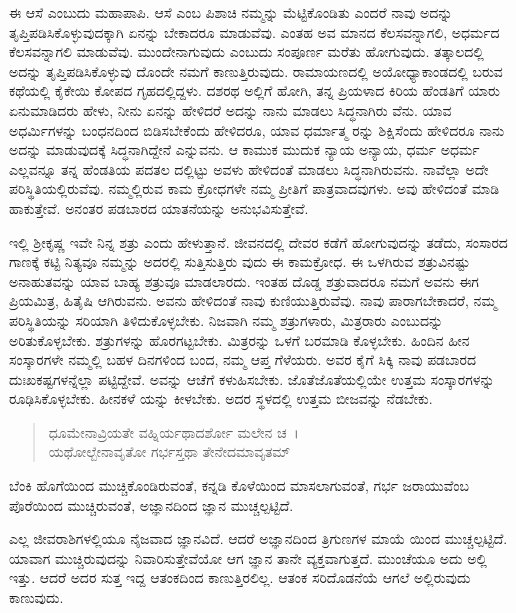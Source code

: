 ಈ ಆಸೆ ಎಂಬುದು ಮಹಾಪಾಪಿ. ಆಸೆ ಎಂಬ ಪಿಶಾಚಿ ನಮ್ಮನ್ನು ಮೆಟ್ಟಿಕೊಂಡಿತು ಎಂದರೆ ನಾವು ಅದನ್ನು ತೃಪ್ತಿಪಡಿಸಿಕೊಳ್ಳುವುದಕ್ಕಾಗಿ ಏನನ್ನು ಬೇಕಾದರೂ ಮಾಡುವೆವು. ಎಂತಹ ಅವ ಮಾನದ ಕೆಲಸವನ್ನಾಗಲಿ, ಅಧರ್ಮದ ಕೆಲಸವನ್ನಾಗಲಿ ಮಾಡುವೆವು. ಮುಂದೇನಾಗುವುದು ಎಂಬುದು ಸಂಪೂರ್ಣ ಮರೆತು ಹೋಗುವುದು. ತತ್ಕಾಲದಲ್ಲಿ ಅದನ್ನು ತೃಪ್ತಿಪಡಿಸಿಕೊಳ್ಳುವು ದೊಂದೇ ನಮಗೆ ಕಾಣುತ್ತಿರುವುದು. ರಾಮಾಯಣದಲ್ಲಿ ಅಯೋಧ್ಯಾಕಾಂಡದಲ್ಲಿ ಬರುವ ಕಥೆಯಲ್ಲಿ ಕೈಕೇಯಿ ಕೋಪದ ಗೃಹದಲ್ಲಿದ್ದಳು. ದಶರಥ ಅಲ್ಲಿಗೆ ಹೋಗಿ, ತನ್ನ ಪ್ರಿಯಳಾದ ಕಿರಿಯ ಹೆಂಡತಿಗೆ ಯಾರು ಏನುಮಾಡಿದರು ಹೇಳು, ನೀನು ಏನನ್ನು ಹೇಳಿದರೆ ಅದನ್ನು ನಾನು ಮಾಡಲು ಸಿದ್ಧನಾಗಿರು ವೆನು. ಯಾವ ಅಧರ್ಮಿಗಳನ್ನು ಬಂಧನದಿಂದ ಬಿಡಿಸಬೇಕೆಂದು ಹೇಳಿದರೂ, ಯಾವ ಧರ್ಮಾತ್ಮ ರನ್ನು ಶಿಕ್ಷಿಸೆಂದು ಹೇಳಿದರೂ ನಾನು ಅದನ್ನು ಮಾಡುವುದಕ್ಕೆ ಸಿದ್ಧನಾಗಿದ್ದೇನೆ ಎನ್ನುವನು. ಆ ಕಾಮುಕ ಮುದುಕ ನ್ಯಾಯ ಅನ್ಯಾಯ, ಧರ್ಮ ಅಧರ್ಮ ಎಲ್ಲವನ್ನೂ ತನ್ನ ಹೆಂಡತಿಯ ಪದತಲ ದಲ್ಲಿಟ್ಟು ಅವಳು ಹೇಳಿದಂತೆ ಮಾಡಲು ಸಿದ್ಧನಾಗಿರುವನು. ನಾವೆಲ್ಲಾ ಅದೇ ಪರಿಸ್ಥಿತಿಯಲ್ಲಿರುವೆವು. ನಮ್ಮಲ್ಲಿರುವ ಕಾಮ ಕ್ರೋಧಗಳೇ ನಮ್ಮ ಪ್ರೀತಿಗೆ ಪಾತ್ರವಾದವುಗಳು. ಅವು ಹೇಳಿದಂತೆ ಮಾಡಿ ಹಾಕುತ್ತೇವೆ. ಅನಂತರ ಪಡಬಾರದ ಯಾತನೆಯನ್ನು ಅನುಭವಿಸುತ್ತೇವೆ.

ಇಲ್ಲಿ ಶ‍್ರೀಕೃಷ್ಣ ಇವೇ ನಿನ್ನ ಶತ್ರು ಎಂದು ಹೇಳುತ್ತಾನೆ. ಜೀವನದಲ್ಲಿ ದೇವರ ಕಡೆಗೆ ಹೋಗುವುದನ್ನು ತಡೆದು, ಸಂಸಾರದ ಗಾಣಕ್ಕೆ ಕಟ್ಟಿ ನಿತ್ಯವೂ ನಮ್ಮನ್ನು ಅದರಲ್ಲಿ ಸುತ್ತಿಸುತ್ತಿರು ವುದು ಈ ಕಾಮಕ್ರೋಧ. ಈ ಒಳಗಿರುವ ಶತ್ರುವಿನಷ್ಟು ಅನಾಹುತವನ್ನು ಯಾವ ಬಾಹ್ಯ ಶತ್ರುವೂ ಮಾಡಲಾರದು. ಇಂತಹ ದೊಡ್ಡ ಶತ್ರುವಾದರೂ ನಮಗೆ ಅವನು ಈಗ ಪ್ರಿಯಮಿತ್ರ, ಹಿತೈಷಿ ಆಗಿರುವನು. ಅವನು ಹೇಳಿದಂತೆ ನಾವು ಕುಣಿಯುತ್ತಿರುವೆವು. ನಾವು ಪಾರಾಗಬೇಕಾದರೆ, ನಮ್ಮ ಪರಿಸ್ಥಿತಿಯನ್ನು ಸರಿಯಾಗಿ ತಿಳಿದುಕೊಳ್ಳಬೇಕು. ನಿಜವಾಗಿ ನಮ್ಮ ಶತ್ರುಗಳಾರು, ಮಿತ್ರರಾರು ಎಂಬುದನ್ನು ಅರಿತುಕೊಳ್ಳಬೇಕು. ಶತ್ರುಗಳನ್ನು ಹೊರಗಟ್ಟಬೇಕು. ಮಿತ್ರರನ್ನು ಒಳಗೆ ಬರಮಾಡಿ ಕೊಳ್ಳಬೇಕು. ಹಿಂದಿನ ಹೀನ ಸಂಸ್ಕಾರಗಳೇ ನಮ್ಮಲ್ಲಿ ಬಹಳ ದಿನಗಳಿಂದ ಬಂದ, ನಮ್ಮ ಆಪ್ತ ಗೆಳೆಯರು. ಅವರ ಕೈಗೆ ಸಿಕ್ಕಿ ನಾವು ಪಡಬಾರದ ದುಃಖಕಷ್ಟಗಳನ್ನೆಲ್ಲಾ ಪಟ್ಟಿದ್ದೇವೆ. ಅವನ್ನು ಆಚೆಗೆ ಕಳುಹಿಸಬೇಕು. ಜೊತೆಜೊತೆಯಲ್ಲಿಯೇ ಉತ್ತಮ ಸಂಸ್ಕಾರಗಳನ್ನು ರೂಢಿಸಿಕೊಳ್ಳಬೇಕು. ಹೀನಕಳೆ ಯನ್ನು ಕೀಳಬೇಕು. ಅದರ ಸ್ಥಳದಲ್ಲಿ ಉತ್ತಮ ಬೀಜವನ್ನು ನೆಡಬೇಕು.

\begin{verse}
ಧೂಮೇನಾವ್ರಿಯತೇ ವಹ್ನಿರ್ಯಥಾದರ್ಶೋ ಮಲೇನ ಚ~।\\ಯಥೋಲ್ಬೇನಾವೃತೋ ಗರ್ಭಸ್ತಥಾ ತೇನೇದಮಾವೃತಮ್ 
\end{verse}

{\small ಬೆಂಕಿ ಹೊಗೆಯಿಂದ ಮುಚ್ಚಿಕೊಂಡಿರುವಂತೆ, ಕನ್ನಡಿ ಕೊಳೆಯಿಂದ ಮಾಸಲಾಗುವಂತೆ, ಗರ್ಭ ಜರಾಯುವೆಂಬ ಪೊರೆಯಿಂದ ಮುಚ್ಚಿರುವಂತೆ, ಅಜ್ಞಾನದಿಂದ ಜ್ಞಾನ ಮುಚ್ಚಲ್ಪಟ್ಟಿದೆ.}

ಎಲ್ಲ ಜೀವರಾಶಿಗಳಲ್ಲಿಯೂ ನೈಜವಾದ ಜ್ಞಾನವಿದೆ. ಆದರೆ ಅಜ್ಞಾನದಿಂದ ತ್ರಿಗುಣಗಳ ಮಾಯೆ ಯಿಂದ ಮುಚ್ಚಲ್ಪಟ್ಟಿದೆ. ಯಾವಾಗ ಮುಚ್ಚಿರುವುದನ್ನು ನಿವಾರಿಸುತ್ತೇವೆಯೋ ಆಗ ಜ್ಞಾನ ತಾನೇ ವ್ಯಕ್ತವಾಗುತ್ತದೆ. ಮುಂಚೆಯೂ ಅದು ಅಲ್ಲಿ ಇತ್ತು. ಆದರೆ ಅದರ ಸುತ್ತ ಇದ್ದ ಆತಂಕದಿಂದ ಕಾಣುತ್ತಿರಲಿಲ್ಲ. ಆತಂಕ ಸರಿದೊಡನೆಯೆ ಆಗಲೆ ಅಲ್ಲಿರುವುದು ಕಾಣುವುದು.

